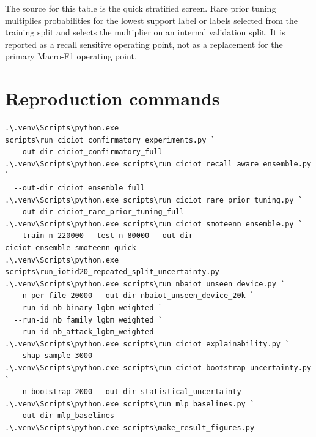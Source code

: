 \documentclass[10pt]{article}
\begin{document}
The source for this table is the quick stratified screen. Rare prior tuning multiplies probabilities for the lowest support label or labels selected from the training split and selects the multiplier on an internal validation split. It is reported as a recall sensitive operating point, not as a replacement for the primary Macro-F1 operating point.

\section*{Reproduction commands}

\begin{verbatim}
.\.venv\Scripts\python.exe scripts\run_ciciot_confirmatory_experiments.py `
  --out-dir ciciot_confirmatory_full
.\.venv\Scripts\python.exe scripts\run_ciciot_recall_aware_ensemble.py `
  --out-dir ciciot_ensemble_full
.\.venv\Scripts\python.exe scripts\run_ciciot_rare_prior_tuning.py `
  --out-dir ciciot_rare_prior_tuning_full
.\.venv\Scripts\python.exe scripts\run_ciciot_smoteenn_ensemble.py `
  --train-n 220000 --test-n 80000 --out-dir ciciot_ensemble_smoteenn_quick
.\.venv\Scripts\python.exe scripts\run_iotid20_repeated_split_uncertainty.py
.\.venv\Scripts\python.exe scripts\run_nbaiot_unseen_device.py `
  --n-per-file 20000 --out-dir nbaiot_unseen_device_20k `
  --run-id nb_binary_lgbm_weighted `
  --run-id nb_family_lgbm_weighted `
  --run-id nb_attack_lgbm_weighted
.\.venv\Scripts\python.exe scripts\run_ciciot_explainability.py `
  --shap-sample 3000
.\.venv\Scripts\python.exe scripts\run_ciciot_bootstrap_uncertainty.py `
  --n-bootstrap 2000 --out-dir statistical_uncertainty
.\.venv\Scripts\python.exe scripts\run_mlp_baselines.py `
  --out-dir mlp_baselines
.\.venv\Scripts\python.exe scripts\make_result_figures.py
\end{verbatim}
\end{document}
